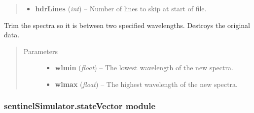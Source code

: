 \documentclass[letterpaper,10pt,english]{sphinxmanual}
\begin{document}
\begin{fulllineitems}
\begin{fulllineitems}
\begin{quote}
\begin{description}
\begin{itemize}
\item {} 
\textbf{hdrLines} (\emph{int}) -- Number of lines to skip at start of file.

\end{itemize}

\end{description}\end{quote}

\end{fulllineitems}


\begin{fulllineitems}
\label{source/sentinelSimulator:sentinelSimulator.spectra.spectra.trim}
Trim the spectra so it is between two specified wavelengths. Destroys the original data.
\begin{quote}\begin{description}
\item[{Parameters}] \leavevmode\begin{itemize}
\item {} 
\textbf{wlmin} (\emph{float}) -- The lowest wavelength of the new spectra.

\item {} 
\textbf{wlmax} (\emph{float}) -- The highest wavelength of the new spectra.

\end{itemize}

\end{description}\end{quote}

\end{fulllineitems}


\end{fulllineitems}



\subsubsection{sentinelSimulator.stateVector module}
\label{source/sentinelSimulator:module-sentinelSimulator.stateVector}\label{source/sentinelSimulator:sentinelsimulator-statevector-module}
\end{document}
